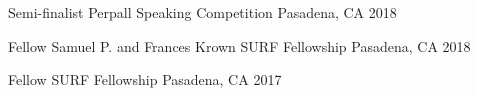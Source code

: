 
\begin{cvhonors}

  \cvhonor
    {Semi-finalist} %
    {Perpall Speaking Competition} %
    {Pasadena, CA} %
    {2018} %

  \cvhonor
    {Fellow} %
    {Samuel P. and Frances Krown SURF Fellowship} %
    {Pasadena, CA} %
    {2018} %

  \cvhonor
    {Fellow} %
    {SURF Fellowship} %
    {Pasadena, CA} %
    {2017} %

\end{cvhonors}
